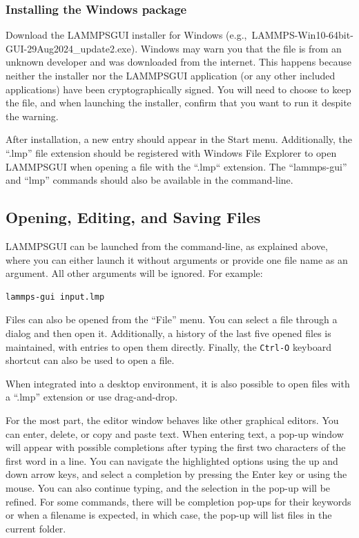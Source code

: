 \documentclass[9pt,tutorial]{livecoms}
\newcommand{\lammpsgui}{\textsf{LAMMPS\textendash GUI}}
\begin{document}
\begin{appendices}
\subsubsection{Installing the Windows package}

Download the \lammpsgui{} installer for Windows
(e.g.,~LAMMPS-Win10-64bit-GUI-29Aug2024\_update2.exe).  Windows may warn
you that the file is from an unknown developer and was downloaded from
the internet.  This happens because neither the installer nor the
\lammpsgui{} application (or any other included applications) have been
cryptographically signed.  You will need to choose to keep the file, and
when launching the installer, confirm that you want to run it despite
the warning.

After installation, a new entry should appear in the Start menu.
Additionally, the ``.lmp'' file extension should be registered with
Windows File Explorer to open \lammpsgui{} when opening a file with the
``.lmp`` extension.  The ``lammps-gui'' and ``lmp'' commands should also
be available in the command-line.

\subsection{Opening, Editing, and Saving Files}

\lammpsgui{} can be launched from the command-line, as explained above, where you
can either launch it without arguments or provide one file name as an argument.  All
other arguments will be ignored.  For example:
\begin{lstlisting}[language=tcl]
lammps-gui input.lmp
\end{lstlisting}
Files can also be opened from the ``File'' menu.  You can select a
file through a dialog and then open it.  Additionally, a history of
the last five opened files is maintained, with entries to open them directly.
Finally, the \texttt{Ctrl-O} keyboard shortcut can also be used to open a file.

When integrated into a desktop environment, it is also possible to open
files with a ``.lmp'' extension or use drag-and-drop.

For the most part, the editor window behaves like other graphical
editors.  You can enter, delete, or copy and paste text.   When entering
text, a pop-up window will appear with possible completions after typing
the first two characters of the first word in a line.  You can
navigate the highlighted options using the up and down arrow keys, and select a
completion by pressing the Enter key or using the mouse.  You can also continue
typing, and the selection in the pop-up will be refined.  For some
commands, there will be completion pop-ups for their
keywords or when a filename is expected, in which case,
the pop-up will list files in the current folder.


\end{appendices}
\end{document}
